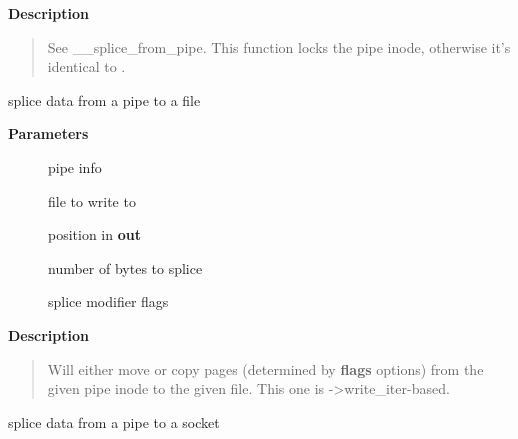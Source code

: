 \documentclass[a4paper,8pt,english]{sphinxmanual}
\begin{document}
\textbf{Description}
\begin{quote}

See \_\_splice\_from\_pipe. This function locks the pipe inode,
otherwise it's identical to {\hyperref[filesystems/index:c.__splice_from_pipe]{\emph{}}}.
\end{quote}

\begin{fulllineitems}
\label{filesystems/index:c.iter_file_splice_write}
splice data from a pipe to a file

\end{fulllineitems}


\textbf{Parameters}
\begin{description}
\item[{}] \leavevmode
pipe info

\item[{}] \leavevmode
file to write to

\item[{}] \leavevmode
position in \textbf{out}

\item[{}] \leavevmode
number of bytes to splice

\item[{}] \leavevmode
splice modifier flags

\end{description}

\textbf{Description}
\begin{quote}

Will either move or copy pages (determined by \textbf{flags} options) from
the given pipe inode to the given file.
This one is -\textgreater{}write\_iter-based.
\end{quote}

\begin{fulllineitems}
\label{filesystems/index:c.generic_splice_sendpage}
splice data from a pipe to a socket

\end{fulllineitems}
\end{document}
